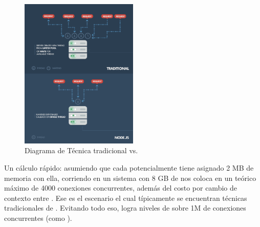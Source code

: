 \begin{figure}[h!]
	\centering
	\includegraphics[width=0.5\textwidth]{figuras/cap2/diagram_traditional_vs_node_serverthread.png}
	\caption{Diagrama de Técnica tradicional vs. \nodejsNAME \serverAS \threadPL}
	\label{figure:diagram_traditional_vs_nodejs_server_thread}
\end{figure}



Un cálculo rápido: asumiendo que cada \threadPL potencialmente tiene asignado 2 MB de memoria con ella, corriendo en un sistema con 8 GB de \memoryRamPC nos coloca en un teórico máximo de 4000 conexiones concurrentes, además del costo por cambio de contexto entre \threadsPL. Ese es el escenario el cual típicamente se encuentran técnicas tradicionales de \webServingINT. Evitando todo eso, \nodejsNAME logra niveles de \scalabilityQA sobre 1M de conexiones concurrentes (como \proofConceptCPT).

